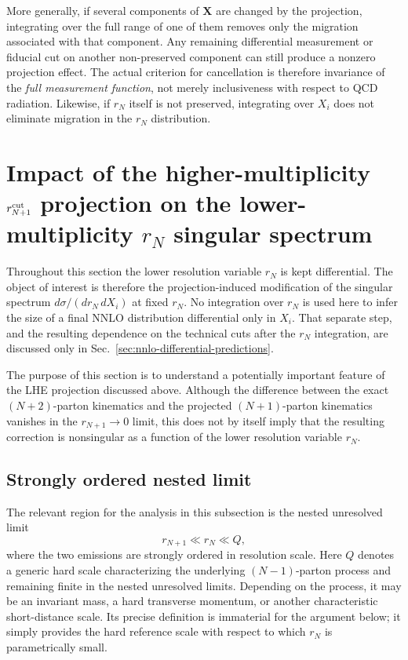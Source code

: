 \documentclass[11pt]{article}
\newcommand{\rn}{r_N}
\newcommand{\rnp}{r_{N+1}}
\begin{document}
More generally, if several components of \(\mathbf X\) are changed by the projection, integrating over the
full range of one of them removes only the migration associated with that component. Any remaining differential
measurement or fiducial cut on another non-preserved component can still produce a nonzero projection
effect. The actual criterion for cancellation is therefore invariance of the \emph{full measurement
function}, not merely inclusiveness with respect to QCD radiation. Likewise, if \(\rn\) itself is not
preserved, integrating over \(X_i\) does not eliminate migration in the \(\rn\) distribution.

\section{Impact of the higher-multiplicity \texorpdfstring{$r_{N+1}^{\rm cut}$}{rN+1cut} projection on the lower-multiplicity \texorpdfstring{$r_N$}{rN} singular spectrum}
\label{sec:higher-singular-spectrum}

Throughout this section the lower resolution variable $\rn$ is kept differential.  The object of interest is
therefore the projection-induced modification of the singular spectrum
$d\sigma/(d\rn\,dX_i)$ at fixed $\rn$.  No integration over $\rn$ is used here to infer the size of a final
NNLO distribution differential only in $X_i$.  That separate step, and the resulting dependence on the
technical cuts after the $\rn$ integration, are discussed only in
Sec.~\ref{sec:nnlo-differential-predictions}.


The purpose of this section is to understand a potentially important feature of the LHE projection discussed
above. Although the difference between the exact \((N+2)\)-parton kinematics and the projected
\((N+1)\)-parton kinematics vanishes in the \(\rnp\to0\) limit, this does not by itself imply that the
resulting correction is nonsingular as a function of the lower resolution variable \(\rn\).

\subsection{Strongly ordered nested limit}
\label{subsec:strongly-ordered-higher-projection}

The relevant region for the analysis in this subsection is the nested unresolved limit
\begin{equation}
\rnp\ll\rn\ll Q,
\label{eq:strong-ordering}
\end{equation}
where the two emissions are strongly ordered in resolution scale. Here \(Q\) denotes a generic hard scale
characterizing the underlying \((N-1)\)-parton process and remaining finite in the nested unresolved limits.
Depending on the process, it may be an invariant mass, a hard transverse momentum, or another characteristic
short-distance scale. Its precise definition is immaterial for the argument below; it simply provides the
hard reference scale with respect to which \(\rn\) is parametrically small.
\end{document}
